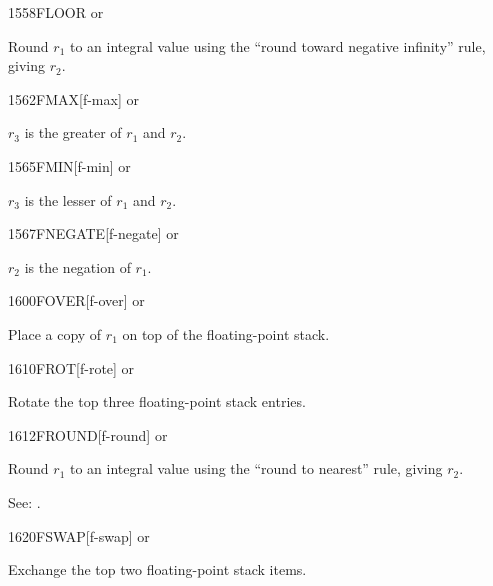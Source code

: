 \begin{newword}{1558}{FLOOR}
	 or

	Round $r_1$ to an integral value using the ``round toward
	negative infinity'' rule, giving $r_2$.
\end{newword}


\begin{newword}{1562}{FMAX}[f-max]
	 or

	$r_3$ is the greater of $r_1$ and $r_2$.
\end{newword}


\begin{newword}{1565}{FMIN}[f-min]
	 or

	$r_3$ is the lesser of $r_1$ and $r_2$.
\end{newword}


\begin{newword}{1567}{FNEGATE}[f-negate]
	 or

	$r_2$ is the negation of $r_1$.
\end{newword}


\begin{newword}{1600}{FOVER}[f-over]
	 or

	Place a copy of $r_1$ on top of the floating-point stack.
\end{newword}


\begin{newword}{1610}{FROT}[f-rote]
	 or

	Rotate the top three floating-point stack entries.
\end{newword}


\begin{newword}{1612}{FROUND}[f-round]
	 or

	Round $r_1$ to an integral value using the ``round to nearest''
	rule, giving $r_2$.

\item[See:]
	.
\end{newword}


\begin{newword}{1620}{FSWAP}[f-swap]
	 or

	Exchange the top two floating-point stack items.
\end{newword}


